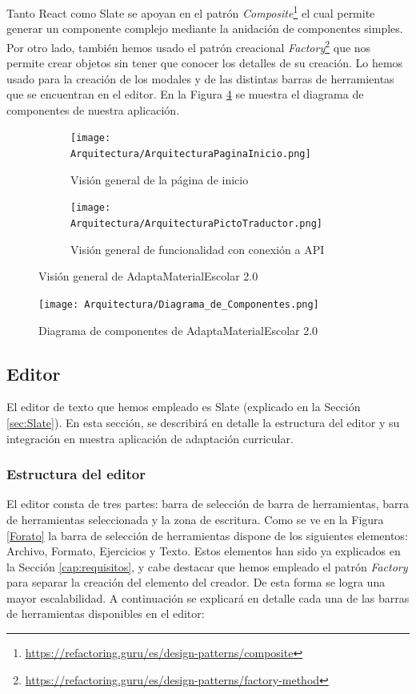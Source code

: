 Tanto React como Slate se apoyan en el patrón \textit{Composite}\footnote{\url{https://refactoring.guru/es/design-patterns/composite}} el cual permite generar un componente complejo mediante la anidación de componentes simples. Por otro lado, también hemos usado el patrón creacional \textit{Factory}\footnote{\url{https://refactoring.guru/es/design-patterns/factory-method}} que nos permite crear objetos sin tener que conocer los detalles de su creación. Lo hemos usado para la creación de los modales y de las distintas barras de herramientas que se encuentran en el editor. En la Figura \ref{fig:diagramaComponentes} se muestra el diagrama de componentes de nuestra aplicación.
\begin{figure}[ht!]
  \centering
  \begin{subfigure}{\textwidth}
    \centering
    \texttt{[image: Arquitectura/ArquitecturaPaginaInicio.png]}
    \caption{Visión general de la página de inicio}
    \label{fig:arquitecturageneral1}
  \end{subfigure}

  \begin{subfigure}{\textwidth}
    \centering
    \texttt{[image: Arquitectura/ArquitecturaPictoTraductor.png]}
    \caption{Visión general de funcionalidad con conexión a API}
    \label{fig:arquitecturageneral2}
  \end{subfigure}
  \caption{Visión general de AdaptaMaterialEscolar 2.0}
  \label{fig:arquitecturageneral}
\end{figure}

\begin{figure}[ht!]
  \centering
  \texttt{[image: Arquitectura/Diagrama\_de\_Componentes.png]}
  \caption{Diagrama de componentes de AdaptaMaterialEscolar 2.0}
  \label{fig:diagramaComponentes}
\end{figure}

\subsection{Editor}
\label{Editor}
El editor de texto que hemos empleado es Slate (explicado en la Sección \ref{sec:Slate}). En esta sección, se describirá en detalle la estructura del editor y su integración en nuestra aplicación de adaptación curricular.

\subsubsection{Estructura del editor}
El editor consta de tres partes: barra de selección de barra de herramientas, barra de herramientas seleccionada y la zona de escritura. Como se ve en la Figura \ref{Forato} la barra de selección de herramientas dispone de los siguientes elementos: Archivo, Formato, Ejercicios y Texto. Estos elementos han sido ya explicados en la Sección \ref{cap:requisitos}, y cabe destacar que hemos empleado el patrón \textit{Factory} para separar la creación del elemento del creador. De esta forma se logra una mayor escalabilidad.
A continuación se explicará en detalle cada una de las barras de herramientas disponibles en el editor:

